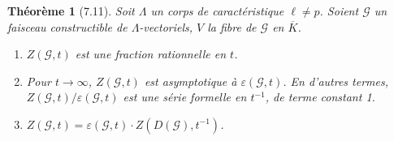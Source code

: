 \documentclass[11pt]{amsart}
\theoremstyle{plain}
\newtheorem{theorem}{Th\'eor\`eme}[section]
\theoremstyle{definition}
\begin{document}
\begin{theorem}[7.11]
Soit $\Lambda$ un corps de caract\'eristique $\ell \not= p$. Soient $\mathcal{G}$ un faisceau constructible de $\Lambda$-vectoriels, $V$ la fibre de $\mathcal{G}$ en $\overline{K}$.
\begin{enumerate}
\item[(i)] $Z(\mathcal{G},t)$ est une fraction rationnelle en $t$.
\item[(ii)] Pour $t \to \infty$, $Z(\mathcal{G},t)$ est asymptotique \`a $\varepsilon(\mathcal{G},t)$. En d'autres termes, $Z(\mathcal{G},t)/\varepsilon(\mathcal{G},t)$ est une s\'erie formelle en $t^{-1}$, de terme constant 1.
\item[(iii)] $Z(\mathcal{G},t) = \varepsilon(\mathcal{G},t) \cdot Z(D(\mathcal{G}),t^{-1})$.
\end{enumerate}
\end{theorem}
\end{document}
